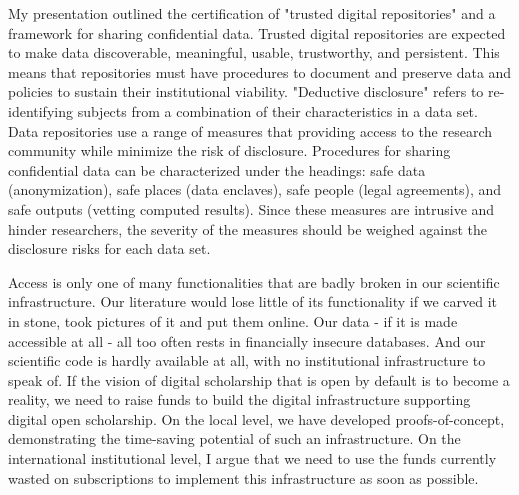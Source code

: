 \documentclass[a4paper,UKenglish]{dagrep}
\begin{document}
{}
\license
My presentation outlined the certification of "trusted digital repositories" and a framework for 
sharing confidential data.  Trusted digital repositories are expected to make data discoverable, 
meaningful, usable, trustworthy, and persistent.  This means that repositories must have 
procedures to document and preserve data and policies to sustain their institutional viability.   
"Deductive disclosure" refers to re-identifying subjects from a combination of their 
characteristics in a data set.  Data repositories use a range of measures that providing access 
to the research community while minimize the risk of disclosure.  Procedures for sharing 
confidential data can be characterized under the headings: safe data (anonymization), safe 
places (data enclaves), safe people (legal agreements), and safe outputs (vetting computed 
results).   Since these measures are intrusive and hinder researchers, the severity of the 
measures should be weighed against the disclosure risks for each data set. 
  


{}
\license
{}
Access is only one of many functionalities that are badly broken in our
scientific infrastructure. Our literature would lose little of its functionality
if we carved it in stone, took pictures of it and put them online. Our data - if
it is made accessible at all - all too often rests in financially insecure
databases. And our scientific code is hardly available at all, with no
institutional infrastructure to speak of. If the vision of digital scholarship
that is open by default is to become a reality, we need to raise funds to build
the digital infrastructure supporting digital open scholarship. On the local
level, we have developed proofs-of-concept, demonstrating the time-saving
potential of such an infrastructure. On the international institutional level, I
argue that we need to use the funds currently wasted on subscriptions to
implement this infrastructure as soon as possible.
\end{document}
